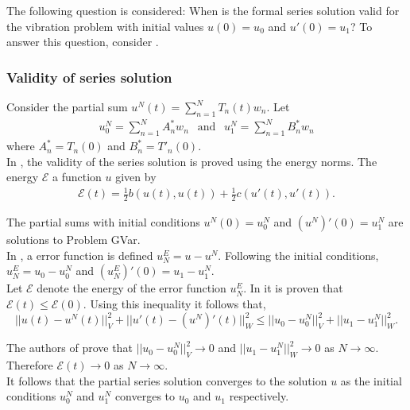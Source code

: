 \documentclass[../../main.tex]{subfiles}
\begin{document}
The following question is considered: When is the formal series solution valid for the vibration problem with initial values $u(0) = u_0$ and $u'(0) = u_1$? To answer this question, consider \cite{CVV18}.\\

\subsubsection{Validity of series solution}
Consider the partial sum $u^{N}(t) = \sum_{n=1}^{N} T_{n}(t)w_n$. Let
\begin{eqnarray*}
	u_0^{N} = \sum_{n=1}^{N} A^*_n w_n \ \ \textrm{ and } \ \ u_{1}^{N} =\sum_{n=1}^{N} B^*_n w_n
\end{eqnarray*} where $A^*_n = T_n(0)$ and $B^*_n = T'_n(0)$.\\

In \cite{CVV18}, the validity of the series solution is proved using the energy norms. The energy $\mathcal{E}$ a function $u$ given by
\begin{eqnarray}
	\mathcal{E} (t) = \frac{1}{2} b(u(t), u(t)) + \frac{1}{2} c(u'(t), u'(t)). \label{eq:1D_Model:ModalAnalysisEnergy}
\end{eqnarray}

The partial sums with initial conditions $u^N(0) = u^N_0$ and $(u^N)'(0) = u^N_1$ are solutions to Problem GVar.\\

In \cite{CVV18}, a error function is defined $u^E_N = u - u^N$. Following the initial conditions, $u^E_N = u_0 - u^N_0$ and $(u^E_N)'(0) = u_1 - u^N_1$.\\

Let $\mathcal{E}$ denote the energy of the error function $u^E_N$. In \cite{CVV18} it is proven that $\mathcal{E}(t) \leq \mathcal{E}(0)$. Using this inequality it follows that, \[||u(t) -  u^N(t)||_V^2 + ||u'(t) - (u^N)'(t)||^2_W \leq ||u_0 - u^N_0||_V^2 + ||u_1 - u^N_1||_W^2. \]

The authors of \cite{CVV18} prove that $||u_0 - u^N_0||_V^2 \rightarrow 0$ and $||u_1 - u^N_1||_W^2 \rightarrow 0$ as $N \rightarrow \infty$. Therefore $\mathcal{E}(t) \rightarrow 0$ as $N \rightarrow \infty$.\\

It follows that the partial series solution converges to the solution $u$ as the initial conditions $u_0^N$ and $u_1^N$ converges to $u_0$ and $u_1$ respectively.\\
\end{document}
